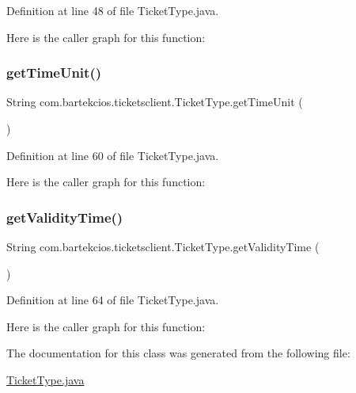 Definition at line 48 of file Ticket\+Type.\+java.

Here is the caller graph for this function\+:
\mbox{\label{classcom_1_1bartekcios_1_1ticketsclient_1_1_ticket_type_abbbf7278bf388e396a8a311a792d2623}} 
\subsubsection{\texorpdfstring{get\+Time\+Unit()}{getTimeUnit()}}
{\footnotesize\ttfamily String com.\+bartekcios.\+ticketsclient.\+Ticket\+Type.\+get\+Time\+Unit (\begin{DoxyParamCaption}{ }\end{DoxyParamCaption})}



Definition at line 60 of file Ticket\+Type.\+java.

Here is the caller graph for this function\+:
\mbox{\label{classcom_1_1bartekcios_1_1ticketsclient_1_1_ticket_type_a712481d3139fdcc756bc6e78b3e79414}} 
\subsubsection{\texorpdfstring{get\+Validity\+Time()}{getValidityTime()}}
{\footnotesize\ttfamily String com.\+bartekcios.\+ticketsclient.\+Ticket\+Type.\+get\+Validity\+Time (\begin{DoxyParamCaption}{ }\end{DoxyParamCaption})}



Definition at line 64 of file Ticket\+Type.\+java.

Here is the caller graph for this function\+:


The documentation for this class was generated from the following file\+:\begin{DoxyCompactItemize}
\item 
\hyperlink{_ticket_type_8java}{Ticket\+Type.\+java}\end{DoxyCompactItemize}
